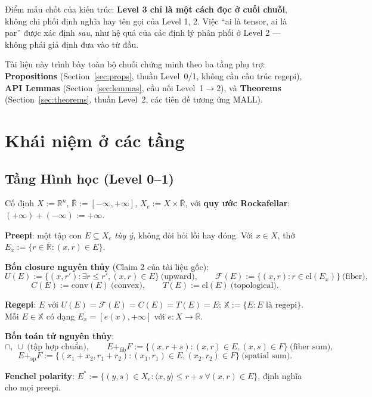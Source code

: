 \documentclass[11pt]{article}
\theoremstyle{plainlabel}
\begin{document}
Điểm mấu chốt của kiến trúc: \textbf{Level 3 chỉ là một cách đọc ở cuối chuỗi}, không chi phối định nghĩa hay tên gọi của Level 1, 2. Việc ``ai là tensor, ai là par'' được xác định \emph{sau}, như hệ quả của các định lý phân phối ở Level 2 — không phải giả định đưa vào từ đầu.

Tài liệu này trình bày toàn bộ chuỗi chứng minh theo ba tầng phụ trợ: \textbf{Propositions} (Section~\ref{sec:props}, thuần Level~0/1, không cần cấu trúc regepi), \textbf{API Lemmas} (Section~\ref{sec:lemmas}, cầu nối Level~1$\to$2), và \textbf{Theorems} (Section~\ref{sec:theorems}, thuần Level~2, các tiên đề tương ứng MALL).

\section{Khái niệm ở các tầng}

\subsection{Tầng Hình học (Level 0--1)}

Cố định $X:=\mathbb R^n$, $\overline{\mathbb R}:=[-\infty,+\infty]$, $X_e:=X\times\overline{\mathbb R}$, với \textbf{quy ước Rockafellar}: $(+\infty)+(-\infty):=+\infty$.

\textbf{Preepi}: một tập con $E\subseteq X_e$ \emph{tùy ý}, không đòi hỏi lồi hay đóng. Với $x\in X$, thớ $E_x:=\{r\in\overline{\mathbb R}:(x,r)\in E\}$.

\textbf{Bốn closure nguyên thủy} (Claim 2 của tài liệu gốc):
\[
U(E):=\{(x,r'):\exists r\le r',(x,r)\in E\}\ \text{(upward)}, \qquad
\mathcal F(E):=\{(x,r):r\in\mathrm{cl}(E_x)\}\ \text{(fiber)},
\]
\[
C(E):=\mathrm{conv}(E)\ \text{(convex)}, \qquad T(E):=\mathrm{cl}(E)\ \text{(topological)}.
\]

\textbf{Regepi}: $E$ với $U(E)=\mathcal F(E)=C(E)=T(E)=E$; $\mathbb X:=\{E:E\text{ là regepi}\}$. Mỗi $E\in\mathbb X$ có dạng $E_x=[e(x),+\infty]$ với $e:X\to\overline{\mathbb R}$.

\textbf{Bốn toán tử nguyên thủy}:
\[
\cap,\ \cup \ \text{(tập hợp chuẩn)}, \qquad
E+_{\mathrm{fib}}F:=\{(x,r+s):(x,r)\in E,(x,s)\in F\}\ \text{(fiber sum)},
\]
\[
E+_{\mathrm{sp}}F:=\{(x_1+x_2,r_1+r_2):(x_1,r_1)\in E,(x_2,r_2)\in F\}\ \text{(spatial sum)}.
\]

\textbf{Fenchel polarity}: $E^*:=\{(y,s)\in X_e:\langle x,y\rangle\le r+s\ \forall(x,r)\in E\}$, định nghĩa cho mọi preepi.
\end{document}
